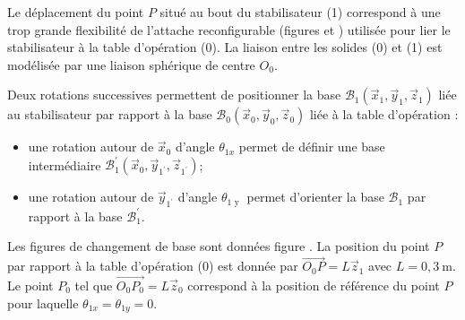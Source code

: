 Le déplacement du point $P$ situé au bout du stabilisateur (1) correspond à une trop grande flexibilité de l'attache reconfigurable (figures \label{fig:01} et \label{fig:02}) utilisée pour lier le stabilisateur à la table d'opération (0). La liaison entre les solides (0) et (1) est modélisée par une liaison sphérique de centre $O_{0}$.

Deux rotations successives permettent de positionner la base $\mathcal{B}_{1}\left(\vec{x}_{1}, \vec{y}_{1}, \vec{z}_{1}\right)$ liée au stabilisateur par rapport à la base $\mathcal{B}_{0}\left(\vec{x}_{0}, \vec{y}_{0}, \vec{z}_{0}\right)$ liée à la table d'opération :
\begin{itemize}
\item une rotation autour de $\vec{x}_{0}$ d'angle $\theta_{1 x}$ permet de définir une base intermédiaire $\mathcal{B}_{1}^{\prime}\left(\vec{x}_{0}, \vec{y}_{1^{\prime}}, \vec{z}_{1^{\prime}}\right)$;
\item une rotation autour de $\vec{y}_{1^{\prime}}$ d'angle $\theta_{1 \text { y }}$ permet d'orienter la base $\mathcal{B}_{1}$ par rapport à la base $\mathcal{B}_{1}^{\prime}$.
\end{itemize}

Les figures de changement de base sont données figure \label{fig:05}. La position du point $P$ par rapport à la table d'opération (0) est donnée par $\overrightarrow{O_{0} P}=L \vec{z}_{1}$ avec $L=0,3 \mathrm{~m}$. Le point $P_{0}$ tel que $\overrightarrow{O_{0} P_{0}}=L \vec{z}_{0}$ correspond à la position de référence du point $P$ pour laquelle $\theta_{1 x}=\theta_{1 y}=0$.





